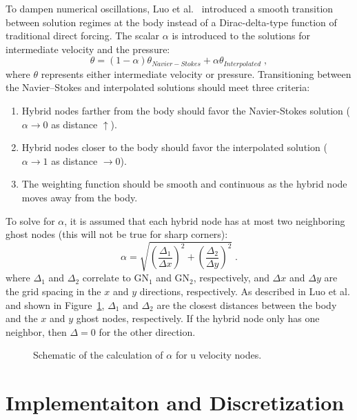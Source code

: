 \documentclass[onehalf,11pt]{beavtex}
\begin{document}
To dampen numerical oscillations, Luo et al.~\cite{Luo:2012gx} introduced a smooth transition between solution regimes at the body instead of a Dirac-delta-type function of traditional direct forcing.
The scalar $\alpha$ is introduced to the solutions for intermediate velocity and the pressure:
\begin{equation}\label{eq:Weight}
\theta = \left(1-\alpha \right)\theta_{Navier-Stokes} + \alpha \theta_{Interpolated} \;,
\end{equation}
where $\theta$ represents either intermediate velocity or pressure.
Transitioning between the Navier--Stokes and interpolated solutions should meet three criteria:
\begin{enumerate}
	\item Hybrid nodes farther from the body should favor the Navier-Stokes solution ($\alpha \rightarrow 0$ as distance $\uparrow$).
	\item Hybrid nodes closer to the body should favor the interpolated solution ($\alpha \rightarrow 1$ as distance $ \rightarrow 0$).
	\item The weighting function should be smooth and continuous as the hybrid node moves away from the body.
\end{enumerate}
To solve for $\alpha$, it is assumed that each hybrid node has at most two neighboring ghost nodes (this will not be true for sharp corners):
\begin{equation}
\alpha = \sqrt{\left(\frac{\Delta_1}{\Delta x}\right)^2 + \left(\frac{\Delta_2}{\Delta y}\right)^2} \;.
\label{eq:Alpha}
\end{equation}
where $\Delta_1$ and $\Delta_2$ correlate to GN$_1$ and GN$_2$, respectively, and $\Delta x$ and $\Delta y$ are the grid spacing in the $x$ and $y$ directions, respectively.
As described in Luo et al. and shown in Figure~\ref{fig:Weight}, $\Delta_1$ and $\Delta_2$ are the closest distances between the body and the $x$ and $y$ ghost nodes, respectively.
If the hybrid node only has one neighbor, then $\Delta=0$ for the other direction.
\begin{figure}[htb]
	\centering
	
	\caption{Schematic of the calculation of $\alpha$ for u velocity nodes.}
	\label{fig:Weight}
\end{figure}

\chapter{Implementaiton and Discretization}\label{Implementation}
\end{document}
